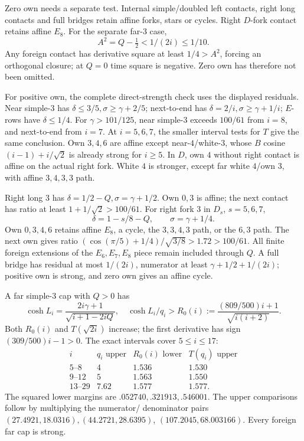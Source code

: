 \documentclass[11pt]{article}
\theoremstyle{definition}
\theoremstyle{remark}
\begin{document}
Zero own needs a separate test. Internal simple/doubled left
contacts, right long contacts and full bridges retain affine
forks, stars or cycles. Right \(D\)-fork contact retains
affine \(E_8\). For the separate far-\(3\) case,
\[
 A^2=Q-\tfrac12<1/(2i)\leq1/10.
\]
Any foreign contact has derivative square at least \(1/4>A^2\),
forcing an orthogonal closure; at \(Q=0\) time square is
negative. Zero own has therefore not been omitted.

For positive own, the complete direct-strength check uses
the displayed residuals. Near simple-\(3\) has
\(\delta\leq3/5,\sigma\geq\gamma+2/5\);
next-to-end has \(\delta=2/i,\sigma\geq\gamma+1/i\);
\(E\)-rows have \(\delta\leq1/4\).
For \(\gamma>101/125\), near simple-\(3\) exceeds
\(100/61\) from \(i=8\), and next-to-end from \(i=7\).
At \(i=5,6,7\), the smaller interval tests for \(T\)
give the same conclusion. Own \(3,4,6\) are affine
except near-\(4\)/white-\(3\), whose \(B\) cosine
\((i-1)+i/\sqrt2\) is already strong for \(i\geq5\).
In \(D\), own \(4\) without right contact is affine on
the actual right fork. White \(4\) is stronger, except
far white \(4\)/own \(3\), with affine \(3,4,3,3\) path.

Right long \(3\) has
\(\delta=1/2-Q,\sigma=\gamma+1/2\).
Own \(0,3\) is affine; the next contact has ratio
at least \(1+1/\sqrt2>100/61\).
For right fork \(3\) in \(D_s\), \(s=5,6,7\),
\[
 \delta=1-s/8-Q,\qquad \sigma=\gamma+1/4.
\]
Own \(0,3,4,6\) retains affine \(E_8\), a cycle,
the \(3,3,4,3\) path, or the \(6,3\) path.
The next own gives ratio
\((\cos(\pi/5)+1/4)/\sqrt{3/8}>1.72>100/61\).
All finite foreign extensions of the \(E_6,E_7,E_8\)
piece remain included through \(Q\).
A full bridge has residual at most \(1/(2i)\),
numerator at least \(\gamma+1/2+1/(2i)\);
positive own is strong, and zero own gives an affine cycle.

A far simple-\(3\) cap with \(Q>0\) has
\[
 \cosh L_i=\frac{2i\gamma+1}{\sqrt{i+1-2iQ}},\quad
 \cosh L_i/q_i>R_0(i)
 :=\frac{(809/500)i+1}{\sqrt{i(i+2)}}.
\]
Both \(R_0(i)\) and \(T(\sqrt{2i})\) increase;
the first derivative has sign \((309/500)i-1>0\).
The exact intervals cover \(5\leq i\leq17\):
\[
\begin{array}{c|c|c|c}
i&q_i\text{ upper}&R_0(i)\text{ lower}&T(q_i)\text{ upper}\\ \hline
5\text{--}8&4&1.536&1.530\\
9\text{--}12&5&1.563&1.550\\
13\text{--}29&7.62&1.577&1.577.
\end{array}
\]
The squared lower margins are \(.052740,\allowbreak .321913,\allowbreak .546001\).
The upper comparisons follow by multiplying the numerator/
denominator pairs
\((27.4921,18.0316),\allowbreak (44.2721,28.6395)\),
\((107.2045,68.003166)\).
Every foreign far cap is strong.
\end{document}
